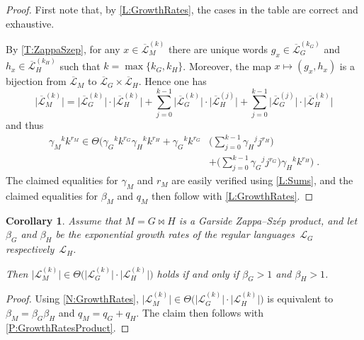 \documentclass[a4paper,final]{article}
\let\zs=\bowtie
\theoremstyle{plain}
\newtheorem{corollary}[corollary]{Corollary}
\theoremstyle{remark}
\theoremstyle{definition}
\begin{document}
\begin{proof}
First note that, by \autoref{L:GrowthRates}, the cases in the table are correct and exhaustive.

By \autoref{T:ZappaSzep}, for any $x\in {\overline{\mathcal{L}}}_M^{(k)}$ there are unique words $g_x\in {\overline{\mathcal{L}}}_G^{(k_G)}$ and $h_x\in {\overline{\mathcal{L}}}_H^{(k_H)}$ such that $k=\max\{k_G,k_H\}$.  Moreover, the map $x\mapsto (g_x,h_x)$ is a bijection from ${\overline{\mathcal{L}}}_M$ to ${\overline{\mathcal{L}}}_G \times {\overline{\mathcal{L}}}_H$.
Hence one has
\[
  \big|{\overline{\mathcal{L}}}_M^{(k)}\big| = \big|{\overline{\mathcal{L}}}_G^{(k)}\big| \cdot \big|{\overline{\mathcal{L}}}_H^{(k)}\big|
      + \sum_{j=0}^{k-1} \big|{\overline{\mathcal{L}}}_G^{(k)}\big| \cdot \big|{\overline{\mathcal{L}}}_H^{(j)}\big|
      + \sum_{j=0}^{k-1} \big|{\overline{\mathcal{L}}}_G^{(j)}\big| \cdot \big|{\overline{\mathcal{L}}}_H^{(k)}\big|
\]
and thus
\begin{align*}
  {\gamma_M}^k k^{r_M} \in \Theta\Bigg(
    {\gamma_G}^k k^{r_G} {\gamma_H}^k k^{r_H}
    + {\gamma_G}^k k^{r_G} & \bigg(\sum_{j=0}^{k-1} {\gamma_H}^j j^{r_H}\bigg) \\
    & + \bigg(\sum_{j=0}^{k-1} {\gamma_G}^j j^{r_G}\bigg) {\gamma_H}^k k^{r_H}
  \Bigg)  \;.
\end{align*}
The claimed equalities for $\gamma_M$ and $r_M$ are easily verified using \autoref{L:Sums}, and the claimed equalities for $\beta_M$ and $q_M$ then follow with \autoref{L:GrowthRates}.
\end{proof}

\begin{corollary}\label{C:GrowthRatesProduct}
Assume that $M=G\zs H$ is a Garside {Zappa--Sz{\'e}p}{} product, and let $\beta_G$ and $\beta_H$ be the exponential growth rates of the regular languages~${\mathcal{L}}_G$ respectively~${\mathcal{L}}_H$.

Then $\big|{\mathcal{L}}_M^{(k)}\big| \in \Theta\Big( \big|{\mathcal{L}}_G^{(k)}\big| \cdot \big|{\mathcal{L}}_H^{(k)}\big| \Big)$ holds if and only if $\beta_G>1$ and $\beta_H>1$.
\end{corollary}
\begin{proof}
Using \autoref{N:GrowthRates}, $\big|{\mathcal{L}}_M^{(k)}\big| \in \Theta\Big( \big|{\mathcal{L}}_G^{(k)}\big| \cdot \big|{\mathcal{L}}_H^{(k)}\big| \Big)$ is equivalent to $\beta_M=\beta_G\beta_H$ and $q_M=q_G+q_H$.
The claim then follows with \autoref{P:GrowthRatesProduct}.
\end{proof}
\end{document}
